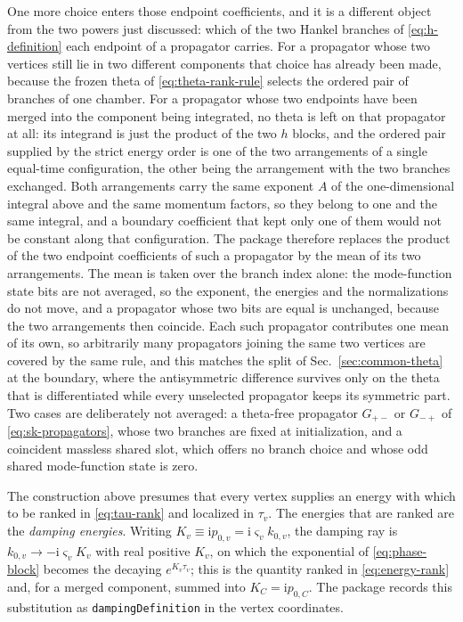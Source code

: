 \documentclass[11pt,a4paper]{article}
\newcommand{\ii}{\mathrm i}
\begin{document}
One more choice enters those endpoint coefficients, and it is a different object from the two powers
just discussed: which of the two Hankel branches of \eqref{eq:h-definition} each endpoint of a
propagator carries. For a propagator whose
two vertices still lie in two different components that choice has already been made, because the
frozen theta of \eqref{eq:theta-rank-rule} selects the ordered pair of branches of one chamber. For a
propagator whose two endpoints have been merged into the component being integrated, no theta is left
on that propagator at all: its integrand is just the product of the two $h$ blocks, and the ordered pair
supplied by the strict energy order is one of the two arrangements of a single equal-time
configuration, the other being the arrangement with the two branches exchanged. Both arrangements carry
the same exponent $A$ of the one-dimensional integral above and the same momentum factors, so they
belong to one and the same integral, and a boundary coefficient that kept only one of them would not be
constant along that configuration. The package therefore replaces the product of the two endpoint
coefficients of such a propagator by the mean of its two arrangements. The mean is taken over the branch
index alone: the mode-function state bits are not averaged, so the exponent, the energies and the normalizations do
not move, and a propagator whose two bits are equal is unchanged, because the two arrangements then
coincide. Each such propagator contributes one mean of its own, so arbitrarily many propagators joining
the same two vertices are covered by the same rule, and this matches the split of
Sec.~\ref{sec:common-theta} at the boundary, where the antisymmetric difference survives only on the
theta that is differentiated while every unselected propagator keeps its symmetric part. Two cases are
deliberately not averaged: a theta-free propagator $G_{+-}$ or $G_{-+}$ of \eqref{eq:sk-propagators},
whose two branches are fixed at initialization, and a coincident massless
shared slot, which offers no branch choice and whose odd shared mode-function state is zero.

The construction above presumes that every vertex supplies an energy with which to be ranked in
\eqref{eq:tau-rank} and localized in $\tau_v$. The energies that are ranked are the \emph{damping
energies}. Writing $K_v\equiv\ii p_{0,v}=\ii\varsigma_vk_{0,v}$, the damping ray is
$k_{0,v}\to-\ii\varsigma_vK_v$ with real positive $K_v$, on which the exponential of
\eqref{eq:phase-block} becomes the decaying $e^{K_v\tau_v}$; this is the quantity ranked in
\eqref{eq:energy-rank} and, for a merged component, summed into $K_C=\ii p_{0,C}$. The package records
this substitution as \texttt{dampingDefinition} in the vertex coordinates.
\end{document}
